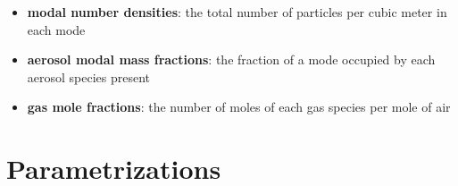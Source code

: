 \begin{itemize}
  \item {\bf modal number densities}: the total number of particles per cubic
        meter in each mode
  \item {\bf aerosol modal mass fractions}: the fraction of a mode occupied
        by each aerosol species present
  \item {\bf gas mole fractions}: the number of moles of each gas species per
        mole of air
\end{itemize}

\section{Parametrizations}
